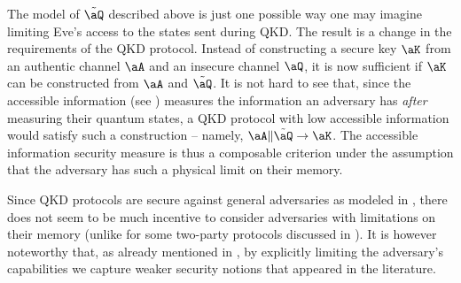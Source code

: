 The model of $\tilde{\aQ}$ described above is just one possible way
one may imagine limiting Eve's access to the states sent during
QKD. The result is a change in the requirements of the QKD
protocol. Instead of constructing a secure key $\aK$ from an authentic
channel $\aA$ and an insecure channel $\aQ$, it is now sufficient if
$\aK$ can be constructed from $\aA$ and $\tilde{\aQ}$. It is not hard
to see that, since the accessible information (see
) measures the information an adversary has
\emph{after} measuring their quantum states, a QKD protocol with low
accessible information would satisfy such a construction \--- namely,
$\aA \| \tilde{\aQ} \rightarrow \aK$. The accessible information
security measure is thus a composable criterion under the assumption
that the adversary has such a physical limit on their memory.

Since QKD protocols are secure against general adversaries as modeled
in , there does not seem to be much incentive to
consider adversaries with limitations on their memory (unlike for some
two-party protocols discussed in ). It is
however noteworthy that, as already mentioned in
, by explicitly limiting the adversary's
capabilities we capture weaker security notions that appeared in the literature.


